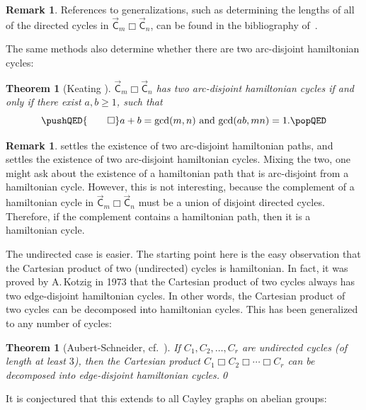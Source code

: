 \documentclass[11pt]{amsart}
\newtheorem{thm}[equation]{Theorem}
\theoremstyle{definition}
\newtheorem{remark}[equation]{Remark}
\newcounter{case}
\numberwithin{case}{startcases}
\numberwithin{equation}{section}
\newcommand{\cartprod}{\mathbin{\Box}}
\begin{document}
	\begin{remark}
		References to generalizations, such as determining the lengths of all of the directed cycles in $\vec{\mathsf C}_m \cartprod \vec{\mathsf C}_n$, can be found in the bibliography of~\cite{JungreisGeneralized}.
	\end{remark}
	
	The same methods also determine whether there are two arc-disjoint hamiltonian cycles:
	
	\begin{thm}[Keating {\cite[Cor.~2.4]{keating1985multiple}}] \label{DisjointHC}
		$\vec{\mathsf C}_m \cartprod \vec{\mathsf C}_n$ has two arc-disjoint hamiltonian cycles if and only if there exist $a,b \ge 1$, such that 
		\[ 
		\pushQED{\qed}
		\text{$a + b = \gcd(m,n)$ and $\gcd(ab,mn) = 1$.} 
		\qedhere
		\popQED 
		\]
	\end{thm}
	
	\begin{remark} \label{PathAndCycle}
		 settles the existence of two arc-disjoint hamiltonian paths, and  settles the existence of two arc-disjoint hamiltonian cycles. Mixing the two, one might ask about the existence of a hamiltonian path that is arc-disjoint from a hamiltonian cycle. However, this is not interesting, because the complement of a hamiltonian cycle in $\vec{\mathsf C}_m \cartprod \vec{\mathsf C}_n$ must be a union of disjoint directed cycles. Therefore, if the complement contains a hamiltonian path, then it is a hamiltonian cycle.
	\end{remark}
	
	The undirected case is easier. The starting point here is the easy observation that the Cartesian product of two (undirected) cycles is hamiltonian. In fact, it was proved by A.\,Kotzig in 1973 that the Cartesian product of two cycles always has two edge-disjoint hamiltonian cycles. In other words, the Cartesian product of two cycles can be decomposed into hamiltonian cycles. This has been generalized to any number of cycles:
	
	\begin{thm}[Aubert-Schneider, cf.\ {\cite[Thm.~A]{AubertSchneider}}]
		If $C_1,C_2,\ldots,C_r$ are undirected cycles \textup(of length at least $3$\textup), then the Cartesian product $C_1 \cartprod C_2 \cartprod \cdots \cartprod C_r$ can be decomposed into edge-disjoint hamiltonian cycles.\qed
	\end{thm}
	
	It is conjectured that this extends to all Cayley graphs on abelian groups:
	
\end{document}
